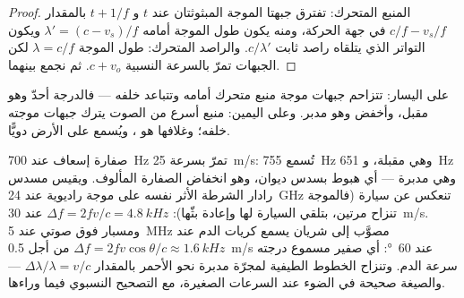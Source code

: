 \begin{proof}
المنبع المتحرك: تفترق جبهتا الموجة المبثوثتان عند $t$ و $t + 1/f$
بالمقدار $c/f - v_s/f$ في جهة الحركة، ومنه يكون طول الموجة أمامه
$\lambda' = (c - v_s)/f$ ويكون التواتر الذي يتلقاه راصد ثابت
$c/\lambda'$. والراصد المتحرك: طول الموجة $\lambda = c/f$ لكن الجبهات تمرّ
بالسرعة النسبية $c + v_o$. ثم نجمع بينهما.
\end{proof}

\begin{omfigure}

{\small على اليسار: تتزاحم جبهات موجة منبع متحرك أمامه وتتباعد
خلفه --- فالدرجة أحدّ وهو مقبل، وأخفض وهو مدبر. وعلى اليمين: منبع
أسرع من الصوت يترك جبهات موجته خلفه؛ وغلافها هو
، ويُسمع على الأرض دويًّا.}
\end{omfigure}

\begin{example}\label{ex:b2:sound-waves:dopplerex}
صفارة إسعاف عند \qty{700}{Hz} تمرّ بسرعة \qty{25}{m/s}: تُسمع \qty{755}{Hz}
وهي مقبلة، و \qty{651}{Hz} وهي مدبرة --- أي هبوط بسدس ديوان،
وهو انخفاض الصفارة المألوف. ويقيس مسدس رادار الشرطة الأثر
نفسه على موجة راديوية عند \qty{24}{GHz} تنعكس عن سيارة (فالموجة
تنزاح مرتين، بتلقي السيارة لها وإعادة بثّها): $\Delta f = 2fv/c =
\qty{4.8}{kHz}$ عند \qty{30}{m/s}. ومسبار فوق صوتي عند \qty{5}{MHz} مصوَّب إلى
شريان يسمع كريات الدم عند $\Delta f = 2fv\cos\theta/c \approx \qty{1.6}{kHz}$
من أجل \qty{0.5}{m/s} عند \qty{60}{\degree}: أي صفير مسموع درجته سرعة
الدم. وتنزاح الخطوط الطيفية لمجرّة مدبرة نحو
الأحمر بالمقدار $\Delta\lambda/\lambda = v/c$ --- والصيغة صحيحة في الضوء عند السرعات الصغيرة،
مع التصحيح النسبوي فيما وراءها.
\end{example}

